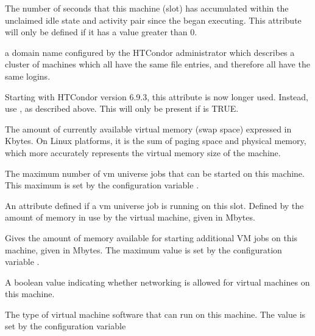 \begin{description}
%
\item[\AdAttr{TotalTimeUnclaimedIdle}:] The number of seconds
that this machine (slot) has accumulated within the
unclaimed idle state and activity pair since the 
began executing.
This attribute will only be defined if it has a value greater than 0.
%
\item[\AdAttr{UidDomain}:] a domain name configured by the HTCondor 
administrator which describes a cluster of machines which all have 
the same  file entries, and therefore all have the same logins.
%
\item[\AdAttr{VirtualMachineID}:] 
Starting with HTCondor version 6.9.3, this attribute is now longer used.
Instead, use , as described above.
This will only be present if  is TRUE.
%
\item[\AdAttr{VirtualMemory}:] The amount of currently available virtual memory 
(swap space) expressed in Kbytes.
On Linux platforms, it is the sum of paging space and physical memory, 
which more accurately represents the virtual memory size of the machine. 
%
\item[\AdAttr{VM\_AvailNum}:] The maximum number of vm universe jobs that
can be started on this machine. This maximum is set by the configuration
variable . 
%
\item[\AdAttr{VM\_Guest\_Mem}:] An attribute defined if a vm universe job
is running on this slot.  Defined by the amount of memory in use by the 
virtual machine, given in Mbytes.
%
\item[\AdAttr{VM\_Memory}:] Gives the amount of memory available for starting 
additional VM jobs on this machine, given in Mbytes.
The maximum value is set by the configuration variable .
%
\item[\AdAttr{VM\_Networking}:] A boolean value indicating whether networking 
is allowed for virtual machines on this machine.
%
\item[\AdAttr{VM\_Type}:] The type of virtual machine software that can run
on this machine.  The value is set by the configuration variable

\end{description}
